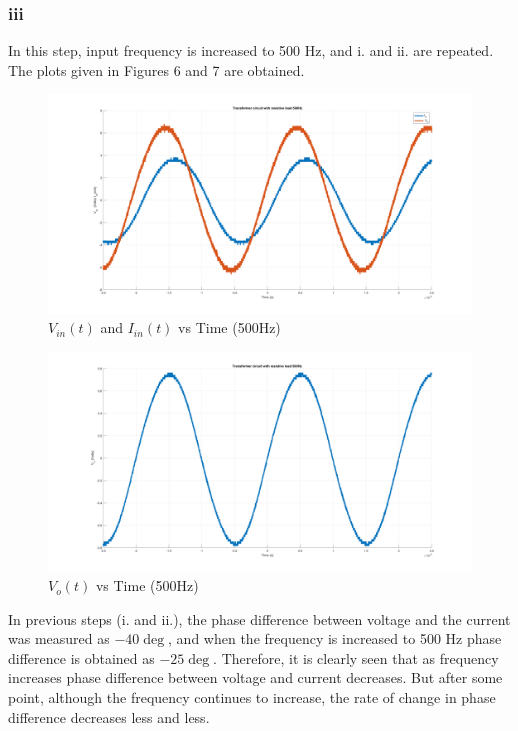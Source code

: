\documentclass[letterpaper,12pt]{article}
\begin{document}
\subsubsection{iii}
In this step, input frequency is increased to 500 Hz, and i. and ii. are repeated. The plots given in Figures 6 and 7 are obtained.
\begin{figure}[H]
    \centering
    \includegraphics[width = 1\textwidth]{2_3_1.png}
    \caption{\(V_{in}(t) \) and \(I_{in}(t)\) vs Time (500Hz)}
\end{figure} 

\begin{figure}[H]
    \centering
    \includegraphics[width = 1\textwidth]{2_3_2.png}
    \caption{\(V_o(t) \) vs Time (500Hz)}
\end{figure} 

In previous steps (i. and ii.), the phase difference between voltage and the current was measured as \(-40\deg \), and when the frequency is increased to 500 Hz phase difference is obtained as \(-25\deg\). Therefore, it is clearly seen that as frequency increases phase difference between voltage and current decreases. But after some point, although the frequency continues to increase, the rate of change in phase difference decreases less and less. 
%
\end{document}
